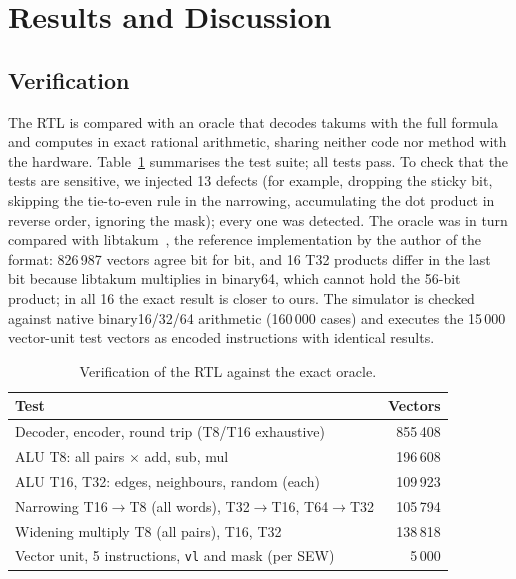 \documentclass[conference]{IEEEtran}
\newcommand{\code}[1]{\texttt{#1}}
\begin{document}
\section{Results and Discussion}

\subsection{Verification}

The RTL is compared with an oracle that decodes takums with the full formula and computes in exact
rational arithmetic, sharing neither code nor method with the hardware. Table~\ref{tab:verif} summarises
the test suite; all tests pass. To check that the tests are sensitive, we injected 13 defects (for
example, dropping the sticky bit, skipping the tie-to-even rule in the narrowing, accumulating the dot
product in reverse order, ignoring the mask); every one was detected. The oracle was in turn compared with libtakum~\cite{libtakum}, the reference
implementation by the author of the format: 826\,987 vectors agree bit for bit, and 16 T32 products differ in
the last bit because libtakum multiplies in binary64, which cannot hold the 56-bit product; in all 16 the
exact result is closer to ours. The simulator is checked against
native binary16/32/64 arithmetic (160\,000 cases) and executes the 15\,000 vector-unit test vectors as
encoded instructions with identical results.

\begin{table}[t]
\caption{Verification of the RTL against the exact oracle.}
\label{tab:verif}
\centering
\begin{tabular}{@{}lr@{}}
\toprule
Test & Vectors\\
\midrule
Decoder, encoder, round trip (T8/T16 exhaustive) & 855\,408\\
ALU T8: all pairs $\times$ add, sub, mul & 196\,608\\
ALU T16, T32: edges, neighbours, random (each) & 109\,923\\
Narrowing T16$\to$T8 (all words), T32$\to$T16, T64$\to$T32 & 105\,794\\
Widening multiply T8 (all pairs), T16, T32 & 138\,818\\
Vector unit, 5 instructions, \code{vl} and mask (per SEW) & 5\,000\\
\bottomrule
\end{tabular}
\end{table}
\end{document}
